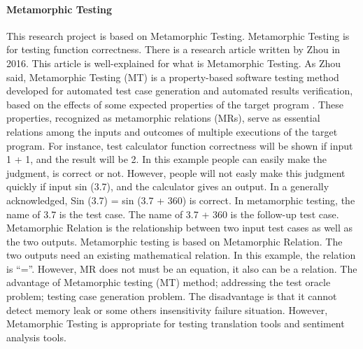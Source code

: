 \documentclass[conference]{IEEEtran}
\begin{document}
\paragraph{Metamorphic Testing}
This research project is based on Metamorphic Testing.
Metamorphic Testing is for testing function correctness.
There is a research article written by Zhou in 2016. This article is
well-explained for what is Metamorphic Testing.
As Zhou said, Metamorphic Testing (MT) is a property-based software testing
method developed for automated test case generation and automated results
verification, based on the effects of some expected properties of the target
program \cite{zhou2016metamorphic}.
These properties, recognized as metamorphic relations (MRs), serve as essential
relations among the inputs and outcomes of multiple executions of the target
program.
For instance, test calculator function correctness will be shown if input 1 + 1,
and the result will be 2. In this example people can easily make the judgment,
is correct or not.
However, people will not easly make this judgment quickly if input sin (3.7),
and the calculator gives an output.
In a generally acknowledged, Sin (3.7) = sin (3.7 + 360) is correct.
In metamorphic testing, the name of 3.7 is the test case. The name of 3.7 + 360
is the follow-up test case.
Metamorphic Relation is the relationship between two input test cases as well as
the two outputs.
Metamorphic testing is based on Metamorphic Relation.
The two outputs need an existing mathematical relation.
In this example, the relation is “=”. However, MR does not must be an equation,
it also can be a relation.
The advantage of Metamorphic testing (MT) method; addressing the test oracle
problem; testing case generation problem.
The disadvantage is that it cannot detect memory leak or some others insensitivity
failure situation.
However, Metamorphic Testing is appropriate for testing translation tools and
sentiment analysis tools.
\end{document}
